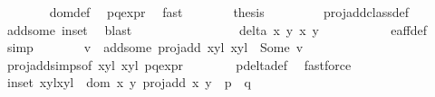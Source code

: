 \begin{isabellebody}
\ \ \ \ \ \ \isamarkupfalse%
\ dom{\isacharunderscore}def\ \isamarkupfalse%
\ p{\isacharunderscore}q{\isacharunderscore}expr\ \isamarkupfalse%
\ fast\isanewline
\ \ \ \ \isamarkupfalse%
\ \isamarkupfalse%
\ {\isacharquery}thesis\ \isanewline
\ \ \ \ \ \ \isamarkupfalse%
\ proj{\isacharunderscore}add{\isacharunderscore}class{\isacharunderscore}def\ \isanewline
\ \ \ \ \ \ \isamarkupfalse%
\ add{\isacharunderscore}some\ in{\isacharunderscore}set\ \isamarkupfalse%
\ blast\isanewline
\ \ \isamarkupfalse%
\isanewline
\ \ \ \ \isamarkupfalse%
\ {}\isanewline
\ \ \ \ \isamarkupfalse%
\ \isamarkupfalse%
\ {\isachardoublequoteopen}delta{\isacharprime}\ x\ y\ x{\isacharprime}\ y{\isacharprime}\ {\isasymnoteq}\ {}{\isachardoublequoteclose}\ \isanewline
\ \ \ \ \ \ \isamarkupfalse%
\ e{\isacharunderscore}aff{\isacharunderscore}{}{\isacharunderscore}def\ \isamarkupfalse%
\ simp\isanewline
\ \ \ \ \isamarkupfalse%
\ \isamarkupfalse%
\ v\ \ add{\isacharunderscore}some{\isacharcolon}\ {\isachardoublequoteopen}proj{\isacharunderscore}add\ {\isacharparenleft}{\isacharparenleft}x{\isacharcomma}y{\isacharparenright}{\isacharcomma}l{\isacharparenright}\ {\isacharparenleft}{\isacharparenleft}x{\isacharprime}{\isacharcomma}y{\isacharprime}{\isacharparenright}{\isacharcomma}l{\isacharprime}{\isacharparenright}\ {\isacharequal}\ Some\ v{\isachardoublequoteclose}\isanewline
\ \ \ \ \ \ \isamarkupfalse%
\ proj{\isacharunderscore}add{\isachardot}simps{\isacharbrackleft}of\ {\isachardoublequoteopen}{\isacharparenleft}{\isacharparenleft}x{\isacharcomma}y{\isacharparenright}{\isacharcomma}l{\isacharparenright}{\isachardoublequoteclose}\ {\isachardoublequoteopen}{\isacharparenleft}{\isacharparenleft}x{\isacharprime}{\isacharcomma}y{\isacharprime}{\isacharparenright}{\isacharcomma}l{\isacharprime}{\isacharparenright}{\isachardoublequoteclose}{\isacharbrackright}\ p{\isacharunderscore}q{\isacharunderscore}expr\isanewline
\ \ \ \ \ \ \isamarkupfalse%
\ p{\isacharunderscore}delta{\isacharprime}{\isacharunderscore}def\ \isamarkupfalse%
\ fastforce\isanewline
\ \ \ \ \isamarkupfalse%
\ \isamarkupfalse%
\ in{\isacharunderscore}set{\isacharcolon}\ {\isachardoublequoteopen}{\isacharparenleft}{\isacharparenleft}{\isacharparenleft}x{\isacharcomma}y{\isacharparenright}{\isacharcomma}l{\isacharparenright}{\isacharcomma}{\isacharparenleft}{\isacharparenleft}x{\isacharprime}{\isacharcomma}y{\isacharprime}{\isacharparenright}{\isacharcomma}l{\isacharprime}{\isacharparenright}{\isacharparenright}\ {\isasymin}\ {\isacharparenleft}dom\ {\isacharparenleft}{\isasymlambda}{\isacharparenleft}x{\isacharcomma}\ y{\isacharparenright}{\isachardot}\ proj{\isacharunderscore}add\ x\ y{\isacharparenright}\ {\isasyminter}\ p\ {\isasymtimes}\ q{\isacharparenright}{\isachardoublequoteclose}\isanewline

\end{isabellebody}

